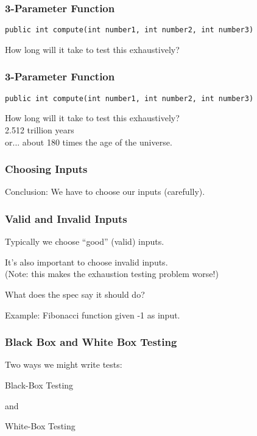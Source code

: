 \begin{frame}
\frametitle{3-Parameter Function}
\begin{changemargin}{1cm}

\texttt{public int compute(int number1, int number2, int number3)}

How long will it take to test this exhaustively?

\end{changemargin}
\end{frame}

\begin{frame}
\frametitle{3-Parameter Function}
\begin{changemargin}{1cm}

\texttt{public int compute(int number1, int number2, int number3)}

How long will it take to test this exhaustively? \\\alert{2.512 trillion years}\\
or... about 180 times the age of the universe.

\end{changemargin}
\end{frame}

\begin{frame}
\frametitle{Choosing Inputs}
\begin{changemargin}{1cm}

Conclusion: We have to choose our inputs (carefully).
\end{changemargin}
\end{frame}

\begin{frame}
\frametitle{Valid and Invalid Inputs}
\begin{changemargin}{1cm}

Typically we choose ``good'' (valid) inputs.

It's also important to choose invalid inputs.\\
\quad (Note: this makes the exhaustion testing problem worse!)

What does the spec say it should do?

Example: Fibonacci function given -1 as input. 

\end{changemargin}
\end{frame}

\begin{frame}
\frametitle{Black Box and White Box Testing}
\begin{changemargin}{1cm}

Two ways we might write tests:

\alert{Black-Box} Testing

and

\alert{White-Box} Testing

\end{changemargin}
\end{frame}

